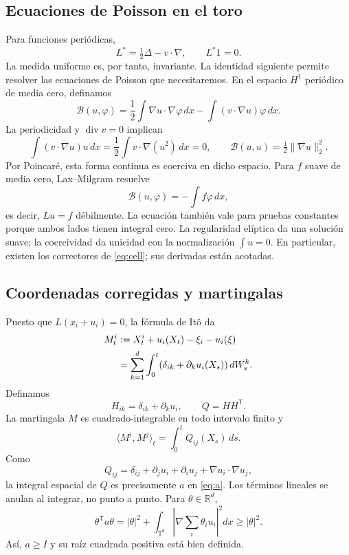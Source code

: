 \documentclass[11pt,a4paper]{article}
\theoremstyle{remark}\newtheorem{remark}{Observación}
\newcommand{\R}{\mathbb R}
\newcommand{\T}{\mathbb T}
\DeclareMathOperator{\diver}{div}
\begin{document}
\subsection{Ecuaciones de Poisson en el toro}
Para funciones periódicas,
\[
 L^*=\tfrac12\Delta-v\cdot\nabla,\qquad L^*1=0.
\]
La medida uniforme es, por tanto, invariante. La identidad siguiente permite resolver las ecuaciones de Poisson que necesitaremos. En el espacio $H^1$ periódico de media cero, definamos
\[
 \mathcal B(u,\varphi)=\frac12\int\nabla u\cdot\nabla\varphi\,dx
 -\int(v\cdot\nabla u)\varphi\,dx.
\]
La periodicidad y $\diver v=0$ implican
\[
 \int(v\cdot\nabla u)u\,dx=\frac12\int v\cdot\nabla(u^2)\,dx=0,
 \qquad\mathcal B(u,u)=\tfrac12\|\nabla u\|_2^2.
\]
Por Poincaré, esta forma continua es coerciva en dicho espacio. Para $f$ suave de media cero, Lax--Milgram resuelve
\[
 \mathcal B(u,\varphi)=-\int f\varphi\,dx,
\]
es decir, $Lu=f$ débilmente. La ecuación también vale para pruebas constantes porque ambos lados tienen integral cero. La regularidad elíptica da una solución suave; la coercividad da unicidad con la normalización $\int u=0$. En particular, existen los correctores de \eqref{eq:cell}; sus derivadas están acotadas.

\subsection{Coordenadas corregidas y martingalas}
Puesto que $L(x_i+u_i)=0$, la fórmula de Itô da
\begin{align}
 M_t^i&:=X_t^i+u_i(X_t)-\xi_i-u_i(\xi)\notag\\
 &=\sum_{k=1}^d\int_0^t
 (\delta_{ik}+\partial_k u_i(X_s))\,dW_s^k.\label{eq:mart}
\end{align}
Definamos
\[
 H_{ik}=\delta_{ik}+\partial_k u_i,\qquad Q=HH^{\mathsf T}.
\]
La martingala $M$ es cuadrado-integrable en todo intervalo finito y
\[
 \langle M^i,M^j\rangle_t=\int_0^t Q_{ij}(X_s)\,ds.
\]
Como
\[
 Q_{ij}=\delta_{ij}+\partial_j u_i+\partial_i u_j
 +\nabla u_i\cdot\nabla u_j,
\]
la integral espacial de $Q$ es precisamente $a$ en \eqref{eq:a}. Los términos lineales se anulan al integrar, no punto a punto. Para $\theta\in\R^d$,
\begin{equation}\label{eq:enhancement}
 \theta^{\mathsf T}a\theta=|\theta|^2+
 \int_{\T^d}\left|\nabla\sum_i\theta_i u_i\right|^2dx\geq|\theta|^2.
\end{equation}
Así, $a\geq I$ y su raíz cuadrada positiva está bien definida.
\end{document}
